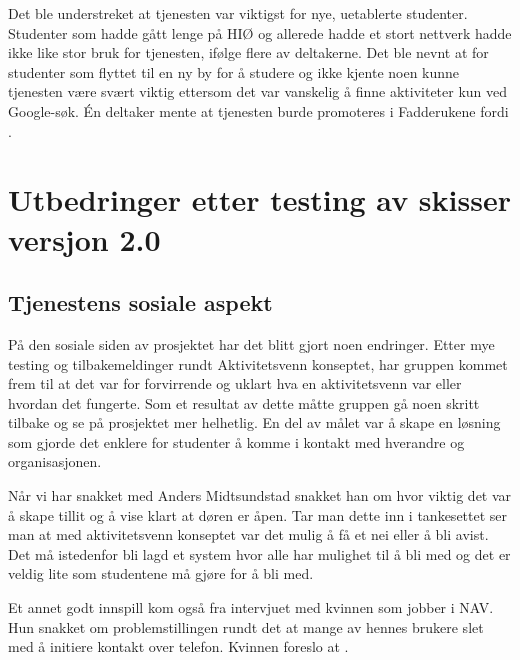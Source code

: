 Det ble understreket at tjenesten var viktigst for nye, uetablerte studenter. Studenter som hadde gått lenge på HIØ og allerede hadde et stort nettverk hadde ikke like stor bruk for tjenesten, ifølge flere av deltakerne. Det ble nevnt at for studenter som flyttet til en ny by for å studere og ikke kjente noen kunne tjenesten være svært viktig ettersom det var vanskelig å finne aktiviteter kun ved Google-søk. Én deltaker mente at tjenesten burde promoteres i Fadderukene fordi . 


\section{Utbedringer etter testing av skisser versjon 2.0}
\label{section:utbedringer-2.0}

\subsection{Tjenestens sosiale aspekt}
\label{section:tjenestens-sosiale-aspekt}

På den sosiale siden av prosjektet har det blitt gjort noen endringer. Etter mye testing og tilbakemeldinger rundt Aktivitetsvenn konseptet, har gruppen kommet frem til at det var for forvirrende og uklart hva en aktivitetsvenn var eller hvordan det fungerte. Som et resultat av dette måtte gruppen gå noen skritt tilbake og se på prosjektet mer helhetlig. En del av målet var å  skape en løsning som gjorde det enklere for studenter å komme i kontakt med hverandre og organisasjonen. 

Når vi har snakket med Anders Midtsundstad snakket han om hvor viktig det var å skape tillit og å vise klart at døren er åpen. Tar man dette inn i tankesettet ser man at med aktivitetsvenn konseptet var det mulig å få et nei eller å bli avist. Det må istedenfor bli lagd et system hvor alle har mulighet til å bli med og det er veldig lite som studentene må gjøre for å bli med.

Et annet godt innspill kom også fra intervjuet med kvinnen som jobber i NAV. Hun snakket om problemstillingen rundt det at mange av hennes brukere slet med å initiere kontakt over telefon. Kvinnen foreslo at  \cite{NAV-INTERVJU:16}.

